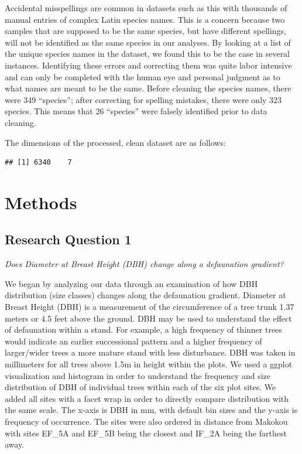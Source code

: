 \documentclass[
  12pt,
]{article}
\begin{document}
Accidental misspellings are common in datasets such as this with
thousands of manual entries of complex Latin species names. This is a
concern because two samples that are supposed to be the same species,
but have different spellings, will not be identified as the same species
in our analyses. By looking at a list of the unique species names in the
dataset, we found this to be the case in several instances. Identifying
these errors and correcting them was quite labor intensive and can only
be completed with the human eye and personal judgment as to what names
are meant to be the same. Before cleaning the species names, there were
349 ``species''; after correcting for spelling mistakes, there were only
323 species. This means that 26 ``species'' were falsely identified
prior to data cleaning.

The dimensions of the processed, clean dataset are as follows:

\begin{verbatim}
## [1] 6340    7
\end{verbatim}

\newpage

\hypertarget{methods}{%
\section{Methods}\label{methods}}

\hypertarget{research-question-1}{%
\subsection{Research Question 1}\label{research-question-1}}

\emph{Does Diameter at Breast Height (DBH) change along a defaunation
gradient?}

We began by analyzing our data through an examination of how DBH
distribution (size classes) changes along the defaunation gradient.
Diameter at Breast Height (DBH) is a measurement of the circumference of
a tree trunk 1.37 meters or 4.5 feet above the ground. DBH may be used
to understand the effect of defaunation within a stand. For example, a
high frequency of thinner trees would indicate an earlier successional
pattern and a higher frequency of larger/wider trees a more mature stand
with less disturbance. DBH was taken in millimeters for all trees above
1.5m in height within the plots. We used a ggplot visualization and
histogram in order to understand the frequency and size distribution of
DBH of individual trees within each of the six plot sites. We added all
sites with a facet wrap in order to directly compare distribution with
the same scale. The x-axis is DBH in mm, with default bin sizes and the
y-axis is frequency of occurrence. The sites were also ordered in
distance from Makokou with sites EF\_5A and EF\_5B being the closest and
IF\_2A being the farthest away.
\end{document}
